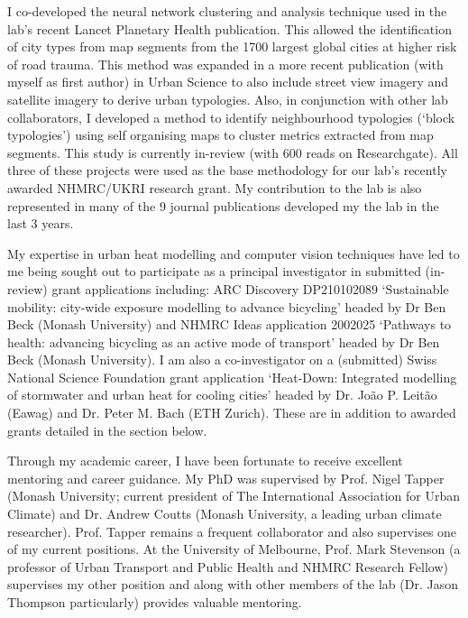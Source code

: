 I co-developed the neural network clustering and analysis technique used in the lab's recent Lancet Planetary Health publication. This allowed the identification of city types from map segments from the 1700 largest global cities at higher risk of road trauma. This method was expanded in a more recent publication (with myself as first author) in Urban Science to also include street view imagery and satellite imagery to derive urban typologies. Also, in conjunction with other lab collaborators, I developed a method to identify neighbourhood typologies (`block typologies') using self organising maps to cluster metrics extracted from map segments. This study is currently in-review (with 600 reads on Researchgate). All three of these projects were used as the base methodology for our lab's recently awarded NHMRC/UKRI research grant. My contribution to the lab is also represented in many of the 9 journal publications developed my the lab in the last 3 years.

My expertise in urban heat modelling and computer vision techniques have led to me being sought out to participate as a principal investigator in submitted (in-review) grant applications including: ARC Discovery DP210102089 `Sustainable mobility: city-wide exposure modelling to advance bicycling' headed by Dr Ben Beck (Monash University) and NHMRC Ideas application 2002025 `Pathways to health: advancing bicycling as an active mode of transport' headed by Dr Ben Beck (Monash University). I am also a co-investigator on a (submitted) Swiss National Science Foundation grant application `Heat-Down: Integrated modelling of stormwater and urban heat for cooling cities' headed by Dr. Jo\~{a}o P. Leit\~{a}o (Eawag) and Dr. Peter M. Bach (ETH Zurich). These are in addition to awarded grants detailed in the section below.



Through my academic career, I have been fortunate to receive excellent mentoring and career guidance. My PhD was supervised by Prof. Nigel Tapper (Monash University; current president of The International Association for Urban Climate) and Dr. Andrew Coutts (Monash University, a leading urban climate researcher). Prof. Tapper remains a frequent collaborator and also supervises one of my current positions. At the University of Melbourne, Prof. Mark Stevenson (a professor of Urban Transport and Public Health and NHMRC Research Fellow) supervises my other position and along with other members of the lab (Dr. Jason Thompson particularly) provides valuable mentoring.

